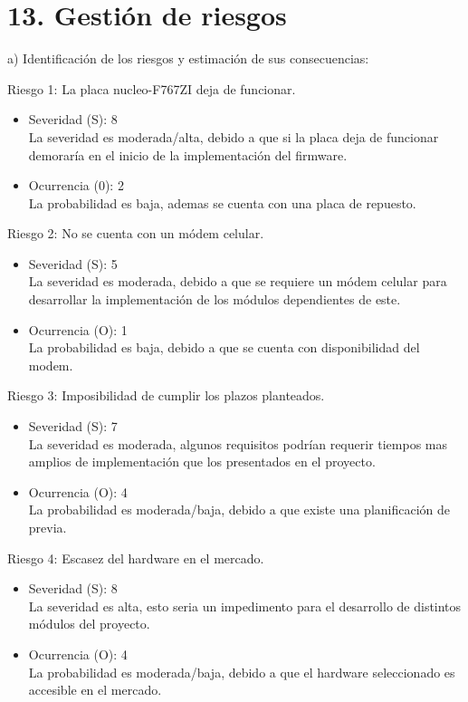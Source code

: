 \documentclass[
11pt, %
]{charter}
\begin{document}
\section{13. Gestión de riesgos}
\label{sec:riesgos}


a) Identificación de los riesgos y estimación de sus consecuencias:
 
Riesgo 1: La placa nucleo-F767ZI deja de funcionar.
\begin{itemize}
	\item Severidad (S): 8\\
	La severidad es moderada/alta, debido a que si la placa deja de funcionar demoraría en el inicio de la implementación del firmware.
	\item Ocurrencia (0): 2\\
	 La probabilidad es baja, ademas se cuenta con una placa de repuesto. 
\end{itemize}   
Riesgo 2: No se cuenta con un módem celular. 
\begin{itemize}
	\item Severidad (S): 5 \\
	La severidad es moderada, debido a que se requiere un módem celular para desarrollar la implementación de los módulos dependientes de este.
	\item Ocurrencia (O): 1 \\
	La probabilidad es baja, debido a que se cuenta con disponibilidad del modem.
\end{itemize}

Riesgo 3: Imposibilidad de cumplir los plazos planteados.
\begin{itemize}
	\item Severidad (S): 7 \\
	La severidad es moderada, algunos requisitos podrían requerir tiempos mas amplios de implementación que los presentados en el proyecto.
	\item Ocurrencia (O): 4 \\
	La probabilidad es moderada/baja, debido a que existe una planificación de previa.
\end{itemize}

Riesgo 4: Escasez del hardware en el mercado.
\begin{itemize}
	\item Severidad (S): 8 \\
	La severidad es alta, esto seria un impedimento para el desarrollo de distintos módulos del proyecto.
	\item Ocurrencia (O): 4 \\
	La probabilidad es moderada/baja, debido a que el hardware seleccionado es accesible en el mercado.
\end{itemize}
\end{document}
